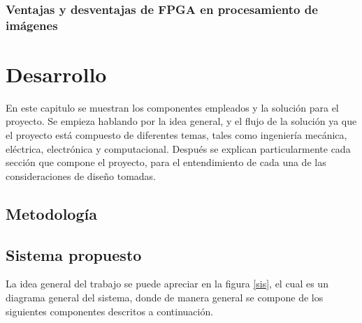 \documentclass[twoside,spanish,ESP,MSc]{plantillaLabUPV}
\theoremstyle{definition}
\begin{document}
\subsection{Ventajas y desventajas de FPGA en procesamiento de imágenes}







\chapter{Desarrollo}

En este capitulo se muestran los componentes empleados y la solución para el proyecto. Se empieza hablando por la idea general, y el flujo de la solución ya que el proyecto está compuesto de diferentes temas, tales como ingeniería mecánica, eléctrica, electrónica y computacional. Después se explican particularmente cada sección que compone el proyecto, para el entendimiento de cada una de las consideraciones de diseño tomadas.

\section{Metodología}

\section{Sistema propuesto}
La idea general del trabajo se puede apreciar en la figura \ref{sis}, el cual es un diagrama general del sistema, donde de manera general se compone de los siguientes componentes descritos a continuación.
\end{document}
